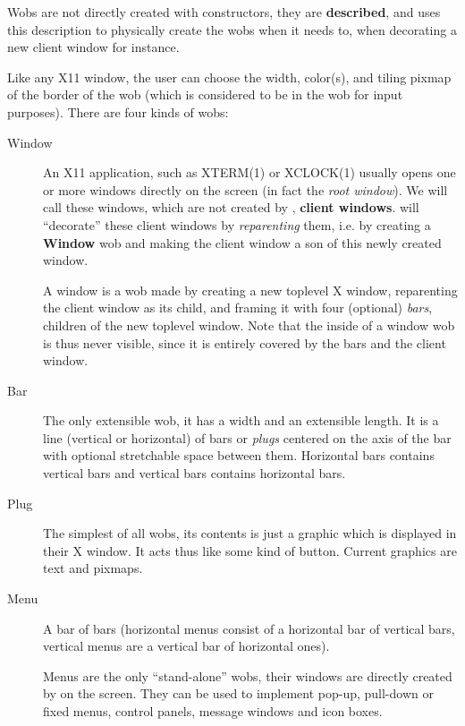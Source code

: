 Wobs are not directly created with {\WOOL} constructors, they are {\bf
described}, and {\GWM} uses this description to physically create the
wobs when it needs to, when decorating a new client window for instance.

Like any X11 window, the user can choose the width, color(s), and tiling
pixmap of the border of the wob (which is considered to be in the wob for
input purposes). There are four kinds of wobs:

\begin{description}

\item[Window] An X11 application, such as XTERM(1) or XCLOCK(1) usually opens
one or more windows directly on the screen (in fact the {\em root window\/}).
We will call these windows, which are not created by {\GWM}, {\bf client
windows}.  {\GWM} will ``decorate'' these client windows by {\em
reparenting\/} them, i.e. by creating a {\bf Window} wob and making the client
window a son of this newly created window.

A window is a wob made by creating a new toplevel X window, reparenting  the
client window as its child, and framing it with four (optional) {\em bars},
children of the new toplevel window. Note that the inside of a window wob is
thus never visible, since it is entirely covered by the bars and the client
window.

\item[Bar] The only extensible wob, it has a width and an extensible length.
It is a line (vertical or horizontal) of bars or {\em plugs\/} centered on the
axis of the bar with optional stretchable space between them. Horizontal bars
contains vertical bars and vertical bars contains horizontal bars.

\item[Plug] The simplest of all wobs, its contents is just a graphic
which is displayed in their X window. It acts thus like some kind of button.
Current graphics are text and pixmaps.

\item[Menu] A bar of bars (horizontal menus consist of a
horizontal bar of vertical bars, vertical menus are a vertical bar of
horizontal ones).

Menus are the only ``stand-alone'' wobs, their windows are directly created
by {\GWM} on the screen. They can be used to implement pop-up, pull-down or
fixed menus, control panels, message windows and icon boxes.

\end{description}

